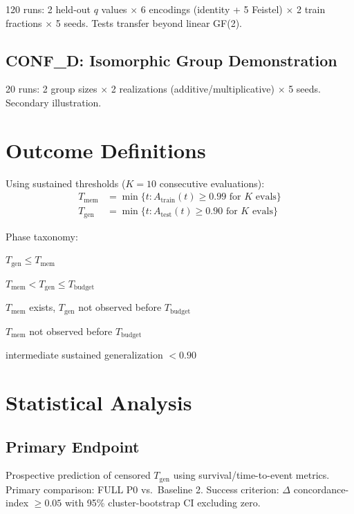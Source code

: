 \documentclass[11pt]{article}
\begin{document}
120 runs: 2 held-out $q$ values $\times$ 6 encodings (identity + 5 Feistel) $\times$ 2 train fractions $\times$ 5 seeds. Tests transfer beyond linear GF(2).

\subsection{CONF\_D: Isomorphic Group Demonstration}

20 runs: 2 group sizes $\times$ 2 realizations (additive/multiplicative) $\times$ 5 seeds. Secondary illustration.

\section{Outcome Definitions}\label{sec:outcomes}

Using sustained thresholds ($K=10$ consecutive evaluations):
\begin{align}
T_{\text{mem}} &= \min\{t : A_{\text{train}}(t) \geq 0.99 \text{ for } K \text{ evals}\} \\
T_{\text{gen}} &= \min\{t : A_{\text{test}}(t) \geq 0.90 \text{ for } K \text{ evals}\}
\end{align}

Phase taxonomy:
\begin{description}[leftmargin=*]
    \item[Direct generalization:] $T_{\text{gen}} \leq T_{\text{mem}}$
    \item[Grokking:] $T_{\text{mem}} < T_{\text{gen}} \leq T_{\text{budget}}$
    \item[Memorized (censored):] $T_{\text{mem}}$ exists, $T_{\text{gen}}$ not observed before $T_{\text{budget}}$
    \item[Underfit:] $T_{\text{mem}}$ not observed before $T_{\text{budget}}$
    \item[Partial:] intermediate sustained generalization $< 0.90$
\end{description}

\section{Statistical Analysis}\label{sec:statistics}

\subsection{Primary Endpoint}

Prospective prediction of censored $T_{\text{gen}}$ using survival/time-to-event metrics. Primary comparison: FULL P0 vs.\ Baseline 2. Success criterion: $\Delta$ concordance-index $\geq 0.05$ with 95\% cluster-bootstrap CI excluding zero.
\end{document}
